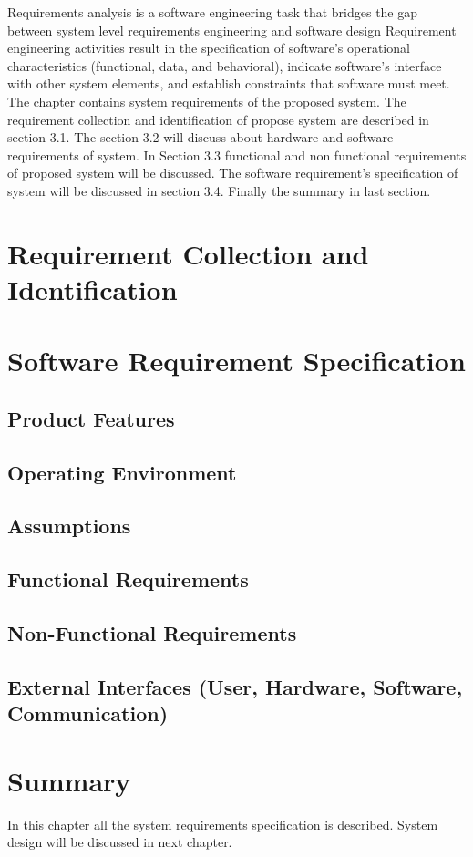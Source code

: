 Requirements analysis is a software engineering task that bridges the gap between system level requirements engineering and software design Requirement engineering activities result in the specification of software’s operational characteristics (functional, data, and behavioral), indicate software’s interface with other system elements, and establish constraints that software must meet.\\
The chapter contains system requirements of the proposed system. The requirement collection and identification of propose system are described in section 3.1. The section 3.2 will discuss about hardware and software requirements of system. In Section 3.3 functional and non functional requirements of proposed system will be discussed. The software requirement’s specification of system will be discussed in section 3.4. Finally the summary in last section.

\section{Requirement Collection and Identification}
\section{Software Requirement Specification}
    \subsection{Product Features}
    \subsection{Operating Environment}
    \subsection{Assumptions}
    \subsection{Functional Requirements}
    \subsection{Non-Functional Requirements}
    \subsection{External Interfaces (User, Hardware, Software, Communication)}

\section{Summary}
In this chapter all the system requirements specification is described. System design will be discussed in next chapter.
